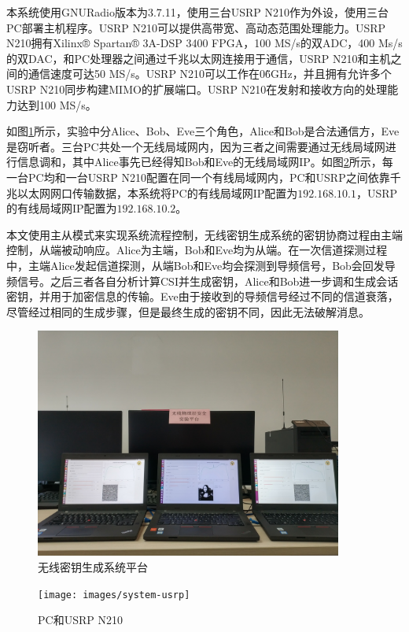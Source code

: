 \documentclass[master]{seuthesis} %
\begin{document}
\begin{Main}
本系统使用GNURadio版本为3.7.11，使用三台USRP N210作为外设，使用三台PC部署主机程序。USRP N210可以提供高带宽、高动态范围处理能力。USRP N210拥有Xilinx® Spartan® 3A-DSP 3400 FPGA，100 MS/s的双ADC，400 Ms/s的双DAC，和PC处理器之间通过千兆以太网连接用于通信，USRP N210和主机之间的通信速度可达50 MS/s。USRP N210可以工作在0\~6GHz，并且拥有允许多个USRP N210同步构建MIMO的扩展端口。USRP N210在发射和接收方向的处理能力达到100 MS/s。

如图\ref{system-three}所示，实验中分Alice、Bob、Eve三个角色，Alice和Bob是合法通信方，Eve是窃听者。三台PC共处一个无线局域网内，因为三者之间需要通过无线局域网进行信息调和，其中Alice事先已经得知Bob和Eve的无线局域网IP。如图\ref{system-usrp}所示，每一台PC均和一台USRP N210配置在同一个有线局域网内，PC和USRP之间依靠千兆以太网网口传输数据，本系统将PC的有线局域网IP配置为$192.168.10.1$，USRP的有线局域网IP配置为$192.168.10.2$。

本文使用主从模式来实现系统流程控制，无线密钥生成系统的密钥协商过程由主端控制，从端被动响应。Alice为主端，Bob和Eve均为从端。在一次信道探测过程中，主端Alice发起信道探测，从端Bob和Eve均会探测到导频信号，Bob会回发导频信号。之后三者各自分析计算CSI并生成密钥，Alice和Bob进一步调和生成会话密钥，并用于加密信息的传输。Eve由于接收到的导频信号经过不同的信道衰落，尽管经过相同的生成步骤，但是最终生成的密钥不同，因此无法破解消息。

\begin{figure}[htbp!]
    \centering \includegraphics[width=0.9\textwidth]{images/system-three}
    \caption{无线密钥生成系统平台}
    \label{system-three}
\end{figure}

\begin{figure}[htbp!]
    \centering \texttt{[image: images/system-usrp]}
    \caption{PC和USRP N210}
    \label{system-usrp}
\end{figure}


\end{Main}
\end{document}
